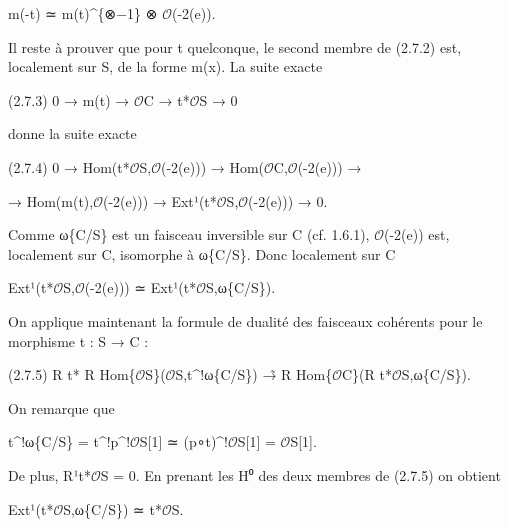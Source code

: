 \documentclass[11pt,a4paper]{article}
\begin{document}
m(-t) ≃ m(t)\textasciicircum{}\{⊗−1\} ⊗ \ensuremath{\mathcal{O}}(-2(e)).

Il reste à prouver que pour t quelconque, le second membre de (2.7.2) est, localement sur S, de la forme m(x). La suite exacte

(2.7.3)        0 → m(t) → \ensuremath{\mathcal{O}}\textunderscore{}C → t\textunderscore{}*\ensuremath{\mathcal{O}}\textunderscore{}S → 0

donne la suite exacte

(2.7.4)        0 → Hom(t\textunderscore{}*\ensuremath{\mathcal{O}}\textunderscore{}S,\ensuremath{\mathcal{O}}(-2(e))) → Hom(\ensuremath{\mathcal{O}}\textunderscore{}C,\ensuremath{\mathcal{O}}(-2(e))) →

→ Hom(m(t),\ensuremath{\mathcal{O}}(-2(e))) → Ext¹(t\textunderscore{}*\ensuremath{\mathcal{O}}\textunderscore{}S,\ensuremath{\mathcal{O}}(-2(e))) → 0.

Comme ω\textunderscore{}\{C/S\} est un faisceau inversible sur C (cf. 1.6.1), \ensuremath{\mathcal{O}}(-2(e)) est, localement sur C, isomorphe à ω\textunderscore{}\{C/S\}. Donc localement sur C

Ext¹(t\textunderscore{}*\ensuremath{\mathcal{O}}\textunderscore{}S,\ensuremath{\mathcal{O}}(-2(e))) ≃ Ext¹(t\textunderscore{}*\ensuremath{\mathcal{O}}\textunderscore{}S,ω\textunderscore{}\{C/S\}).

On applique maintenant la formule de dualité des faisceaux cohérents pour le morphisme t : S → C :

(2.7.5)        R t\textunderscore{}* R Hom\textunderscore{}\{\ensuremath{\mathcal{O}}\textunderscore{}S\}(\ensuremath{\mathcal{O}}\textunderscore{}S,t\textasciicircum{}!ω\textunderscore{}\{C/S\}) →̃ R Hom\textunderscore{}\{\ensuremath{\mathcal{O}}\textunderscore{}C\}(R t\textunderscore{}*\ensuremath{\mathcal{O}}\textunderscore{}S,ω\textunderscore{}\{C/S\}).

On remarque que

t\textasciicircum{}!ω\textunderscore{}\{C/S\} = t\textasciicircum{}!p\textasciicircum{}!\ensuremath{\mathcal{O}}\textunderscore{}S[1] ≃ (p∘t)\textasciicircum{}!\ensuremath{\mathcal{O}}\textunderscore{}S[1] = \ensuremath{\mathcal{O}}\textunderscore{}S[1].

De plus, R¹t\textunderscore{}*\ensuremath{\mathcal{O}}\textunderscore{}S = 0. En prenant les H⁰ des deux membres de (2.7.5) on obtient

Ext¹(t\textunderscore{}*\ensuremath{\mathcal{O}}\textunderscore{}S,ω\textunderscore{}\{C/S\}) ≃ t\textunderscore{}*\ensuremath{\mathcal{O}}\textunderscore{}S.
\end{document}
